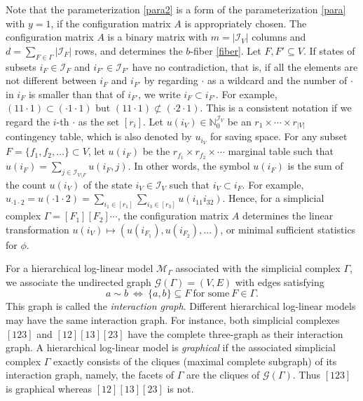 \documentclass[a4paper,12pt]{article}
\theoremstyle{plain}
\theoremstyle{remark}
\begin{document}
Note that the parameterization \eqref{para2} is a form of
the parameterization \eqref{para} with $y=1$, if
the configuration matrix $A$ is appropriately chosen.
The configuration matrix $A$ is a binary matrix with
$m=|\mathcal{I}_V|$ columns and
$d=\sum_{F\in\Gamma}|\mathcal{I}_F|$ rows, and determines
the $b$-fiber \eqref{fiber}. Let $F,F'\subseteq V$. If states
of subsets $i_F\in\mathcal{I}_F$ and $i_{F'}\in\mathcal{I}_{F'}$
have no contradiction, that is, if all the elements are not
different between $i_F$ and $i_{F'}$ by regarding $\cdot$ as
a wildcard and the number of $\cdot$ in
$i_F$ is smaller than that of $i_{F'}$, we write
$i_F \subset i_{F'}$.
For example, $(11\cdot1) \subset (\cdot1\cdot1)$ but
$(11\cdot1) \not\subset (\cdot2\cdot1)$.
This is a consistent notation if we regard
the $i$-th $\cdot$ as the set $[r_i]$.
Let $u(i_V)\in\mathbb{N}_0^{\mathcal{I}_V}$ be an
$r_1\times\cdots\times r_{|V|}$ contingency table, which
is also denoted by $u_{i_V}$ for saving space. For any subset
$F=\{f_1,f_2,\ldots\}\subset V$, let $u(i_F)$ be
the $r_{f_1}\times r_{f_2}\times\cdots$ marginal table such
that $u(i_F)=\sum_{j\in\mathcal{I}_{V\setminus F}}u({i_F,j})$.
In other words, the symbol $u(i_F)$ is the sum of the count
$u(i_V)$ of the state $i_V\in\mathcal{I}_V$ such that
$i_V \subset i_F$. For example,
$u_{\cdot1\cdot2}=u(\cdot1\cdot2)=\sum_{i_1\in[r_1]}\sum_{i_3\in[r_3]} u(i_11i_32)$.
Hence, for a simplicial complex $\Gamma=[F_1][F_2]\cdots $,
the configuration matrix $A$ determines the linear
transformation $u(i_V)\mapsto (u(i_{F_1}),u(i_{F_2}),\ldots)$,
or minimal sufficient statistics for $\phi$.

For a hierarchical log-linear model $\mathcal{M}_{\Gamma}$
associated with the simplicial complex $\Gamma$, we associate
the undirected graph $\mathcal{G}(\Gamma)=(V,E)$ with edges
satisfying
\[
  a \sim b ~ \Leftrightarrow ~ \{a,b\} \subseteq
  F~\text{for~some}~F \in \Gamma.
\]
This graph is called the {\it interaction graph}. Different hierarchical
log-linear models may have the same interaction graph.
For instance, both simplicial complexes $[123]$ and $[12][13][23]$
have the complete three-graph as their interaction graph.
A hierarchical log-linear model is {\it graphical} if
the associated simplicial complex $\Gamma$ exactly consists
of the cliques (maximal complete subgraph) of its interaction
graph, namely, the facets of $\Gamma$ are the cliques of
$\mathcal{G}(\Gamma)$. Thus $[123]$ is graphical whereas
$[12][13][23]$ is not.
\end{document}
